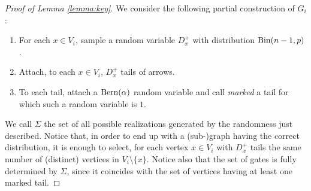 \documentclass[11pt,oneside]{amsart}
\numberwithin{equation}{section}  %
\theoremstyle{plain}
\begin{document}
\begin{proof}[Proof of Lemma \ref{lemma:key}]
		We consider the following partial construction of $G_i$:
		\begin{enumerate}
			\item For each $x\in V_i$, sample a random variable $D_x^+$ with distribution ${\rm Bin}(n-1,p)$.
         	\item Attach, to each $x\in V_i$, $D_x^+$ tails of arrows.
			\item To each tail, attach a ${\rm Bern}(\alpha)$ random variable and call \emph{marked} a tail for which such a random variable is $1$.
         
		\end{enumerate}
		We call $\Sigma$ the set of all possible realizations generated by the randomness just described.  
Notice that, in order to end up with a (sub-)graph having the correct distribution, it is enough to select, for each vertex $x\in V_i$ with $D_x^+$ tails the same number of (distinct) vertices in $V_i\setminus\{x\}$. 
Notice also that the set of gates is fully determined by $\Sigma$, since it coincides with the set of vertices having at least one marked tail.


\end{proof}
\end{document}
